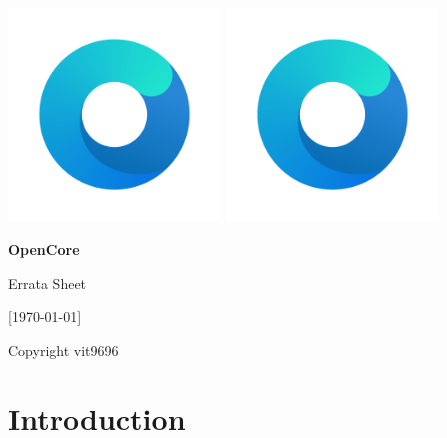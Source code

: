 \documentclass[]{article}
\begin{document}
\begin{titlepage}
   \begin{center}
       \vspace*{2.0in}

       \Huge

         {\includegraphics[width=160pt, height=160pt]{Logos/Logo.pdf}}
         {\includegraphics[width=160pt, height=160pt]{../Logos/Logo.pdf}}

       \sffamily

       \textbf{OpenCore}

       \vspace{0.2in}

       Errata Sheet

       \vspace{0.2in}

        {[}\today{]}

       \normalsize

       \vfill

       \rmfamily

       Copyright  vit9696

   \end{center}
\end{titlepage}

\section{Introduction}\label{introduction}
\end{document}
